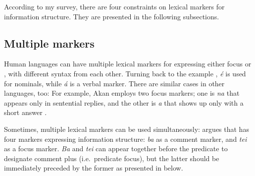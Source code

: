 According to my survey, there are four constraints on lexical markers
for information structure. They are presented in the following
subsections.



\subsection{Multiple markers}
\label{4:ssec:multiple}

Human languages can have multiple lexical markers for expressing
either focus or , with different syntax from each other. Turning
back to the  example , \textit{{\'e}} is
used for nominals, while \textit{{\'a}} is a verbal 
marker. There are similar cases in other languages, too: For example,
Akan employs two focus markers; one is \textit{na} that appears only
in sentential replies, and the other is \textit{a} that shows up only
with a short answer \citep[4]{drubig:03}.





Sometimes, multiple lexical markers can be used
simultaneously: \citet{schneider:09} argues that
 has four markers expressing information structure:
 \textit{ba} as a comment marker, and \textit{tei} as a focus
marker.  \textit{Ba} and \textit{tei} can appear together before the
predicate to designate comment plus  (i.e.\ predicate focus), but
the latter should be immediately preceded by the former as presented
in  below.






